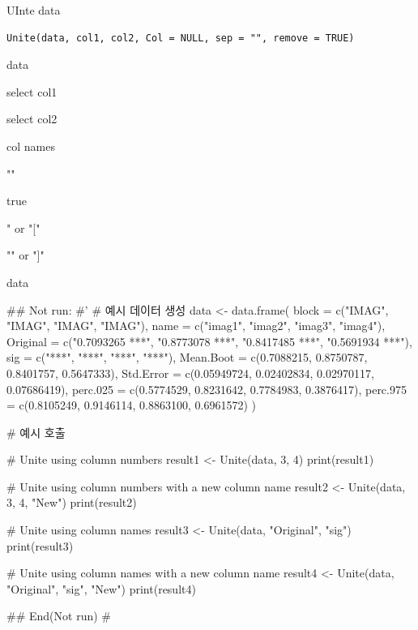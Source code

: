 \documentclass[a4paper]{book}
\begin{document}
%
\begin{Description}
UInte data
\end{Description}
%
\begin{Usage}
\begin{verbatim}
Unite(data, col1, col2, Col = NULL, sep = "", remove = TRUE)
\end{verbatim}
\end{Usage}
%
\begin{Arguments}
\begin{ldescription}
\item[\code{data}] data

\item[\code{col1}] select col1

\item[\code{col2}] select col2

\item[\code{Col}] col names

\item[\code{sep}] ""

\item[\code{remove}] true

\item[\code{left}] " or "["

\item[\code{right}] ""  or  "]"
\end{ldescription}
\end{Arguments}
%
\begin{Value}
data
\end{Value}
%
\begin{Examples}
\begin{ExampleCode}
\#\# Not run: 
#'
# 예시 데이터 생성
data <- data.frame(
  block = c("IMAG", "IMAG", "IMAG", "IMAG"),
  name = c("imag1", "imag2", "imag3", "imag4"),
  Original = c("0.7093265 ***", "0.8773078 ***", "0.8417485 ***", "0.5691934 ***"),
  sig = c("***", "***", "***", "***"),
  Mean.Boot = c(0.7088215, 0.8750787, 0.8401757, 0.5647333),
  Std.Error = c(0.05949724, 0.02402834, 0.02970117, 0.07686419),
  perc.025 = c(0.5774529, 0.8231642, 0.7784983, 0.3876417),
  perc.975 = c(0.8105249, 0.9146114, 0.8863100, 0.6961572)
)

# 예시 호출

# Unite using column numbers
result1 <- Unite(data, 3, 4)
print(result1)

# Unite using column numbers with a new column name
result2 <- Unite(data, 3, 4, "New")
print(result2)

# Unite using column names
result3 <- Unite(data, "Original", "sig")
print(result3)

# Unite using column names with a new column name
result4 <- Unite(data, "Original", "sig", "New")
print(result4)



## End(Not run)
\#
\end{ExampleCode}
\end{Examples}
\end{document}
